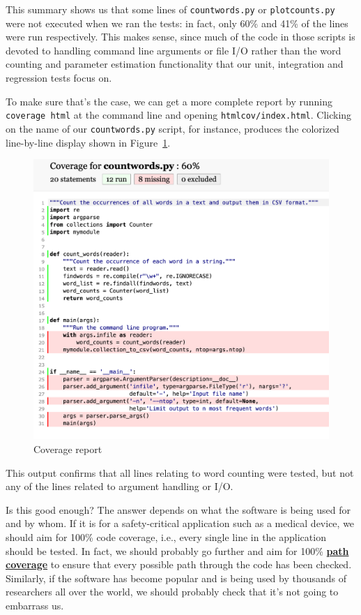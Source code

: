\documentclass[
]{krantz}
\newcommand{\gref}[2]{\hyperlink{#2}{\textbf{#1}}}
\begin{document}
This summary shows us that
some lines of \texttt{countwords.py} or \texttt{plotcounts.py}
were not executed when we ran the tests:
in fact,
only 60\% and 41\% of the lines were run respectively.
This makes sense,
since much of the code in those scripts
is devoted to handling command line arguments or file I/O
rather than the word counting and parameter estimation functionality
that our unit, integration and regression tests focus on.

To make sure that's the case,
we can get a more complete report by running \texttt{coverage\ html} at the command line
and opening \texttt{htmlcov/index.html}.
Clicking on the name of our \texttt{countwords.py} script, for instance,
produces the colorized line-by-line display shown in Figure~\ref{fig:python-coverage}.

\begin{figure}

{\centering \includegraphics[width=1\linewidth]{figures/testing/python-coverage} 

}

\caption{Coverage report}\label{fig:python-coverage}
\end{figure}

This output confirms that all lines relating to word counting were tested,
but not any of the lines related to argument handling or I/O.

Is this good enough?
The answer depends on what the software is being used for and by whom.
If it is for a safety-critical application such as a medical device,
we should aim for 100\% code coverage,
i.e.,
every single line in the application should be tested.
In fact,
we should probably go further and aim for 100\% \gref{path coverage}{path\_coverage}
to ensure that every possible path through the code has been checked.
Similarly,
if the software has become popular and is being used by thousands of researchers all over the world,
we should probably check that it's not going to embarrass us.
\end{document}
